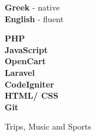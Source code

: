 \documentclass[10pt]{developercv}
\begin{document}
\begin{minipage}[t]{0.3\textwidth}
	\vspace{-\baselineskip}
	\textbf{Greek} - native\\
	\textbf{English} - fluent\\
\end{minipage}
\hfill
\begin{minipage}[t]{0.3\textwidth}
	\vspace{-\baselineskip}
	\textbf{PHP}\\
	\textbf{JavaScript}\\
	\textbf{OpenCart}\\
	\textbf{Laravel}\\
	\textbf{CodeIgniter}\\
	\textbf{HTML/ CSS}\\
	\textbf{Git}\\
\end{minipage}
\hfill
\begin{minipage}[t]{0.3\textwidth}
	\vspace{-\baselineskip}	
	Trips, Music and Sports\\
\end{minipage}

\end{document}
